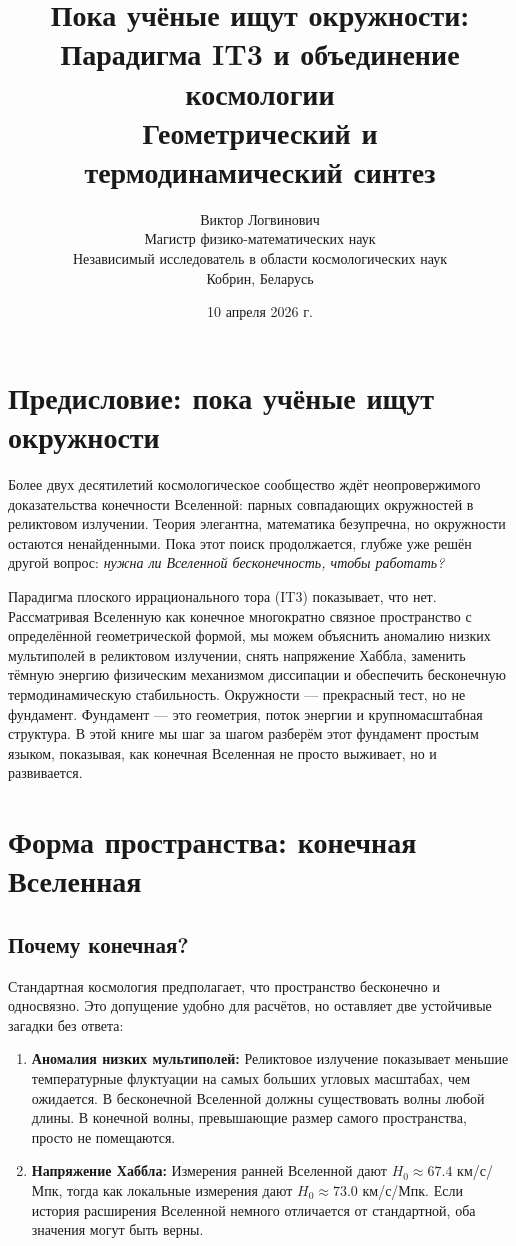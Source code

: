 \documentclass[12pt,a4paper]{report}
\title{\textbf{Пока учёные ищут окружности: \\ Парадигма IT3 и объединение космологии}\\[0.5cm]
\large Геометрический и термодинамический синтез}
\author{Виктор Логвинович\\
Магистр физико-математических наук\\
Независимый исследователь в области космологических наук\\
Кобрин, Беларусь}
\date{10 апреля 2026 г.}
\begin{document}
\maketitle
\tableofcontents
\newpage

\chapter*{Предисловие: пока учёные ищут окружности}
Более двух десятилетий космологическое сообщество ждёт неопровержимого доказательства конечности Вселенной: парных совпадающих окружностей в реликтовом излучении. Теория элегантна, математика безупречна, но окружности остаются ненайденными. Пока этот поиск продолжается, глубже уже решён другой вопрос: \textit{нужна ли Вселенной бесконечность, чтобы работать?}

Парадигма плоского иррационального тора (IT3) показывает, что нет. Рассматривая Вселенную как конечное многократно связное пространство с определённой геометрической формой, мы можем объяснить аномалию низких мультиполей в реликтовом излучении, снять напряжение Хаббла, заменить тёмную энергию физическим механизмом диссипации и обеспечить бесконечную термодинамическую стабильность. Окружности — прекрасный тест, но не фундамент. Фундамент — это геометрия, поток энергии и крупномасштабная структура. В этой книге мы шаг за шагом разберём этот фундамент простым языком, показывая, как конечная Вселенная не просто выживает, но и развивается.

\chapter{Форма пространства: конечная Вселенная}
\section{Почему конечная?}
Стандартная космология предполагает, что пространство бесконечно и односвязно. Это допущение удобно для расчётов, но оставляет две устойчивые загадки без ответа:
\begin{enumerate}
    \item \textbf{Аномалия низких мультиполей:} Реликтовое излучение показывает меньшие температурные флуктуации на самых больших угловых масштабах, чем ожидается. В бесконечной Вселенной должны существовать волны любой длины. В конечной волны, превышающие размер самого пространства, просто не помещаются.
    \item \textbf{Напряжение Хаббла:} Измерения ранней Вселенной дают $H_0 \approx 67.4$ км/с/Мпк, тогда как локальные измерения дают $H_0 \approx 73.0$ км/с/Мпк. Если история расширения Вселенной немного отличается от стандартной, оба значения могут быть верны.
\end{enumerate}
\end{document}
